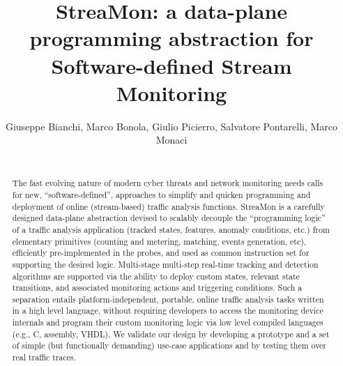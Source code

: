 \documentclass[conference,letterpaper]{sig-alternate-10pt}
\begin{document}
\conferenceinfo{}{}
\title{StreaMon: a data-plane programming abstraction for Software-defined Stream Monitoring}

\author{Giuseppe Bianchi, Marco Bonola, Giulio Picierro, Salvatore Pontarelli, Marco Monaci\\
	\\
}

\maketitle

\begin{abstract}
The fast evolving nature of modern cyber threats and network monitoring needs calls for new, ``software-defined'', approaches to simplify and quicken programming and deployment of online (stream-based) traffic analysis functions. StreaMon is a carefully designed data-plane abstraction devised to scalably decouple the ``programming logic'' of a traffic analysis application (tracked states, features, anomaly conditions, etc.) from elementary primitives (counting and metering, matching, events generation, etc), efficiently pre-implemented in the probes, and used as common instruction set for supporting the desired logic. Multi-stage multi-step real-time tracking and detection algorithms are supported via the ability to deploy custom states, relevant state transitions, and associated monitoring actions and triggering conditions. Such a separation entails platform-independent, portable, online traffic analysis tasks written in a high level language, without requiring developers to access the monitoring device internals and program their custom monitoring logic via low level compiled languages (e.g., C, assembly, VHDL). We validate our design by developing a prototype and a set of simple (but functionally demanding) use-case applications and by testing them over real traffic traces.  
\end{abstract}
\end{document}
